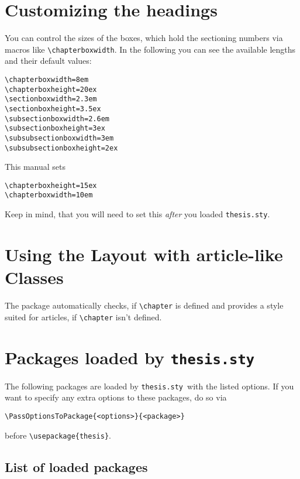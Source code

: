 \documentclass[book]{scrbook}
\newcommand\thesis{\texttt{thesis.sty}}
\begin{document}
\section{Customizing the headings}

You can control the sizes of the boxes, which hold the sectioning numbers via macros like \verb|\chapterboxwidth|. In the following you can see the available lengths and their default values:
\begin{verbatim}
\chapterboxwidth=8em
\chapterboxheight=20ex
\sectionboxwidth=2.3em
\sectionboxheight=3.5ex
\subsectionboxwidth=2.6em
\subsectionboxheight=3ex
\subsubsectionboxwidth=3em
\subsubsectionboxheight=2ex
\end{verbatim}
This manual sets
\begin{verbatim}
\chapterboxheight=15ex
\chapterboxwidth=10em
\end{verbatim}
Keep in mind, that you will need to set this \emph{after} you loaded \thesis.

\section{Using the Layout with article-like Classes}

The package automatically checks, if \verb|\chapter| is defined and provides a style suited for articles, if \verb|\chapter| isn't defined.

\section{Packages loaded by \thesis}

The following packages are loaded by \thesis\ with the listed options. If you want to specify any extra options to these packages, do so via
\begin{verbatim}
\PassOptionsToPackage{<options>}{<package>}
\end{verbatim}
before \verb|\usepackage{thesis}|.

\subsection{List of loaded packages}
\end{document}

